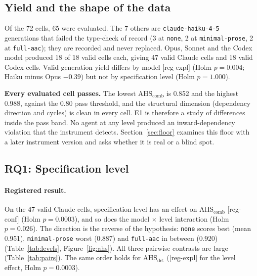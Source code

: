 \documentclass[10pt,a4paper]{article}
\newcommand{\regC}{\textsf{\scriptsize[reg-conf]}}  %
\newcommand{\regX}{\textsf{\scriptsize[reg-expl]}}  %
\newcommand{\lev}[1]{\texttt{\small #1}}
\newcommand{\AHSc}{\mathrm{AHS}_{\mathrm{comb}}}
\newcommand{\AHSd}{\mathrm{AHS}_{\mathrm{det}}}
\begin{document}
\subsection{Yield and the shape of the data}

Of the 72 cells, 65 were evaluated. The 7 others are \texttt{claude-haiku-4-5} generations that failed the
type-check of record (3 at \lev{none}, 2 at \lev{minimal-prose}, 2 at \lev{full-aac}); they are recorded and never
replaced. %
Opus, Sonnet and the Codex model produced 18 of 18 valid cells each, giving 47 valid Claude cells and 18 valid Codex
cells. %
Valid-generation yield differs by model \regX{} (Holm $p = 0.004$; Haiku minus Opus $-0.39$) but not by
specification level (Holm $p = 1.000$). %

\textbf{Every evaluated cell passes.} The lowest $\AHSc$ is 0.852 and the highest 0.988, against the 0.80 pass
threshold, and the structural dimension (dependency direction and cycles) is clean in every cell.
E1 is therefore a study of differences inside the pass band. No agent at any level produced an inward-dependency
violation that the instrument detects. Section~\ref{sec:floor} examines this floor with a later instrument version
and asks whether it is real or a blind spot.

\subsection{RQ1: Specification level}\label{sec:rq1}

\paragraph{Registered result.} On the 47 valid Claude cells, specification level has an effect on $\AHSc$ \regC{}
(Holm $p = 0.0003$), and so does the model $\times$ level interaction (Holm $p = 0.026$).
The direction is the reverse of the hypothesis: \lev{none} scores best (mean 0.951), \lev{minimal-prose} worst
(0.887) and \lev{full-aac} in between (0.920) (Table~\ref{tab:levels}, Figure~\ref{fig:ahs}).
All three pairwise contrasts are large (Table~\ref{tab:pairs}). The same order holds for $\AHSd$ (\regX{} for the
level effect, Holm $p = 0.0003$). %
\end{document}
